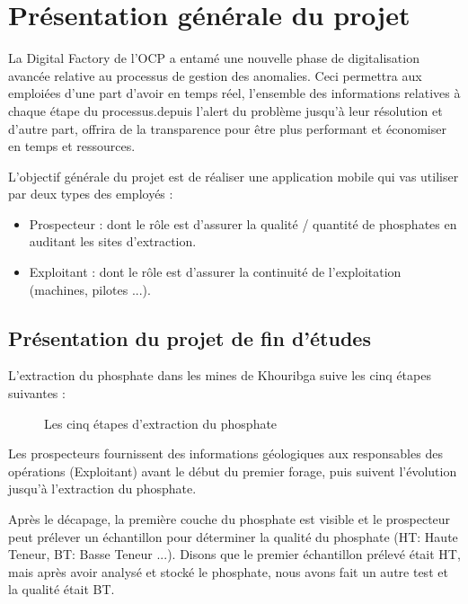 \section{Pr\'esentation g\'en\'erale du projet}
La Digital Factory de l'OCP a entam\'e une nouvelle phase de digitalisation avanc\'ee relative au processus de gestion des anomalies. Ceci permettra aux emploi\'ees d'une part d'avoir en temps r\'eel, l'ensemble des informations relatives \`a chaque \'etape du processus.depuis l'alert du probl\`eme jusqu'\`a leur r\'esolution et d'autre part, offrira de la transparence pour \^etre plus performant et \'economiser en temps et ressources.

L'objectif g\'en\'erale du projet est de r\'ealiser une application mobile qui vas utiliser par deux types des employ\'es :
\begin{itemize}
\item Prospecteur : dont le r\^ole est d'assurer la qualit\'e / quantit\'e de phosphates en auditant les sites d'extraction.
\item Exploitant : dont le r\^ole est d'assurer la continuit\'e de l'exploitation (machines, pilotes ...).
\end{itemize}
\subsection{Pr\'esentation du projet de fin d'\'etudes}
L'extraction du phosphate dans les mines de Khouribga suive les cinq \'etapes suivantes :

\begin{figure}[!htb]
	\caption{\label{fig:my-label} Les cinq \'etapes d'extraction du phosphate}
\end{figure}

Les prospecteurs fournissent des informations g\'eologiques aux responsables des op\'erations (Exploitant) avant le d\'ebut du premier forage, puis suivent l'\'evolution jusqu'\`a l'extraction du phosphate.

Apr\`es le d\'ecapage, la premi\`ere couche du phosphate est visible et le prospecteur peut pr\'elever un \'echantillon pour d\'eterminer la qualit\'e du phosphate (HT: Haute Teneur, BT: Basse Teneur ...).
Disons que le premier \'echantillon pr\'elev\'e \'etait HT, mais apr\`es avoir analys\'e et stock\'e le phosphate, nous avons fait un autre test et la qualit\'e \'etait BT.

